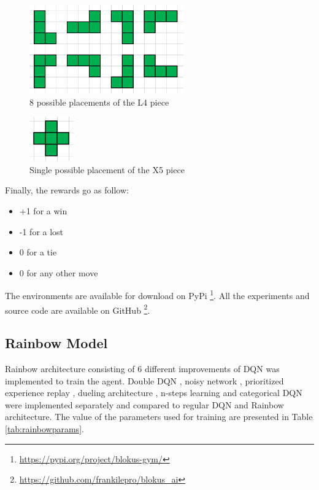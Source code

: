 \documentclass{article}
\begin{document}
\begin{figure}[h!]
\centering
\includegraphics[height=1.5in]{8_moves.png}
  \caption{8 possible placements of the L4 piece}
  \label{fig:8moves}
\end{figure}

\begin{figure}[h!]
\centering
\includegraphics[height=0.75in]{single_move.png}
  \caption{Single possible placement of the X5 piece}
  \label{fig:singleMove}
\end{figure}

Finally, the rewards go as follow:
\begin{itemize}
\item +1 for a win
\item -1 for a lost
\item 0 for a tie
\item 0 for any other move
\end{itemize}

The environments are available for download on PyPi \footnote{\url{https://pypi.org/project/blokus-gym/}}. All the experiments and source code are available on GitHub \footnote{\url{https://github.com/frankilepro/blokus_ai}}.

\subsection{Rainbow Model}
Rainbow architecture \cite{rainbow} consisting of 6 different improvements of DQN was implemented to train the agent. Double DQN \cite{ddqn}, noisy network \cite{noisy}, prioritized experience replay \cite{per}, dueling architecture \cite{dueling}, n-steps learning \cite{nsteps} and categorical DQN were implemented separately and compared to regular DQN and Rainbow architecture. The value of the parameters used for training are presented in Table \ref{tab:rainbowparams}.
\end{document}
